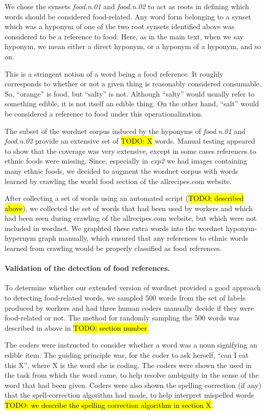 \documentclass[12pt]{article}
\newcommand{\td}[1]{{\color{blu}\hl{TODO: #1}}}
\begin{document}
We chose the synsets \textit{food.n.01} and \textit{food.n.02} to act as roots
in defining which words should be considered food-related.  Any word form
belonging to a synset which was a hyponym of one of the two root synsets
identified above was considered to be a reference to food.  Here, as in the
main text, when we say hyponym, we mean either a direct hyponym, or a hyponym
of a hyponym, and so on.

This is a stringent notion of a word being a food reference.  It roughly
corresponds to whether or not a given thing is reasonably considered 
consumable.  So, ``orange'' is food, but ``salty'' is not.  Although ``salty''
would usually refer to something edible, it is not itself an edible thing.
On the other hand, ``salt'' would be considered a reference to food under 
this operationalization.

The subset of the wordnet corpus induced by the hyponyms of \textit{food.n.01}
and \textit{food.n.02} provide an extensive set of \td{X} words.  Manual
testing appeared to show that the coverage was very extensive, except in 
some cases references to ethnic foods were missing.  Since, especially in
\textit{exp2} we had images containing many ethnic foods, we decided to 
augment the wordnet corpus with words learned by crawling the world food
section of the allrecipes.com website.  

After collecting a set of words using an automated script 
(\td{described above}), we collected the set of words that had been used by
workers and which had been seen during crawling of the allrecipes.com website,
but which were not included in wordnet.  We graphted these extra words into
the wordnet hyponym-hypernym graph manually, which ensured that any references
to ethnic words learned from crawling would be properly classified as 
food references.

\paragraph{Validation of the detection of food references.}
To determine whether our extended version of wordnet provided a good approach
to detecting food-related words, we sampled 500 words from the set of labels
produced by workers and had three human coders manually decide if they were 
food-related or not.  The method for randomly sampling the 500 words was 
described in above in \td{section number}.

The coders were instructed to consider whether a word was a noun signifying
an edible item.  The guiding principle was, for the coder to ask herself,
``can I eat this X'', where X is the word she is coding.  The coders were
shown the used in the task from which the word came, to help resolve ambiguity
in the sense of the word that had been given.  Coders were also shown the 
spelling correction (if any) that the spell-correction algorithm had made,
to help interpret mispelled words \td{we describe the spelling correction 
algorithm in section X}.
\end{document}
